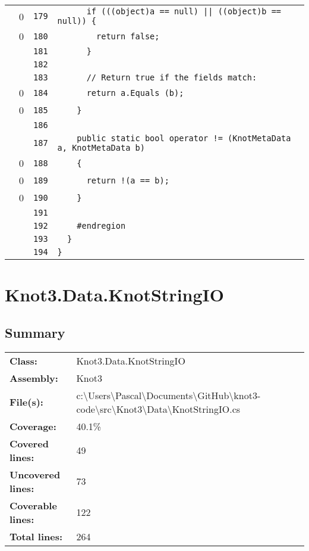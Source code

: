 \documentclass[a4paper,10pt]{article}
\begin{document}
\begin{longtable}[l]{lrrl}
\cellcolor{red} & 0 & \verb~179~ & \verb~      if (((object)a == null) || ((object)b == null)) {~\\
\cellcolor{red} & 0 & \verb~180~ & \verb~        return false;~\\
\cellcolor{gray} &  & \verb~181~ & \verb~      }~\\
\cellcolor{gray} &  & \verb~182~ & \verb~~\\
\cellcolor{gray} &  & \verb~183~ & \verb~      // Return true if the fields match:~\\
\cellcolor{red} & 0 & \verb~184~ & \verb~      return a.Equals (b);~\\
\cellcolor{red} & 0 & \verb~185~ & \verb~    }~\\
\cellcolor{gray} &  & \verb~186~ & \verb~~\\
\cellcolor{gray} &  & \verb~187~ & \verb~    public static bool operator != (KnotMetaData a, KnotMetaData b)~\\
\cellcolor{red} & 0 & \verb~188~ & \verb~    {~\\
\cellcolor{red} & 0 & \verb~189~ & \verb~      return !(a == b);~\\
\cellcolor{red} & 0 & \verb~190~ & \verb~    }~\\
\cellcolor{gray} &  & \verb~191~ & \verb~~\\
\cellcolor{gray} &  & \verb~192~ & \verb~    #endregion~\\
\cellcolor{gray} &  & \verb~193~ & \verb~  }~\\
\cellcolor{gray} &  & \verb~194~ & \verb~}~\\
\end{longtable}
\newpage
\section{Knot3.Data.KnotStringIO}
\subsection{Summary}
\begin{longtable}[l]{ll}
\textbf{Class:} & Knot3.Data.KnotStringIO\\
\textbf{Assembly:} & Knot3\\
\textbf{File(s):} & \begin{minipage}[t]{12cm}{c:\textbackslash Users\textbackslash Pascal\textbackslash Documents\textbackslash GitHub\textbackslash knot3-code\textbackslash src\textbackslash Knot3\textbackslash Data\textbackslash KnotStringIO.cs}\end{minipage} \\
\textbf{Coverage:} & 40.1\%\\
\textbf{Covered lines:} & 49\\
\textbf{Uncovered lines:} & 73\\
\textbf{Coverable lines:} & 122\\
\textbf{Total lines:} & 264\\
\end{longtable}
\end{document}
